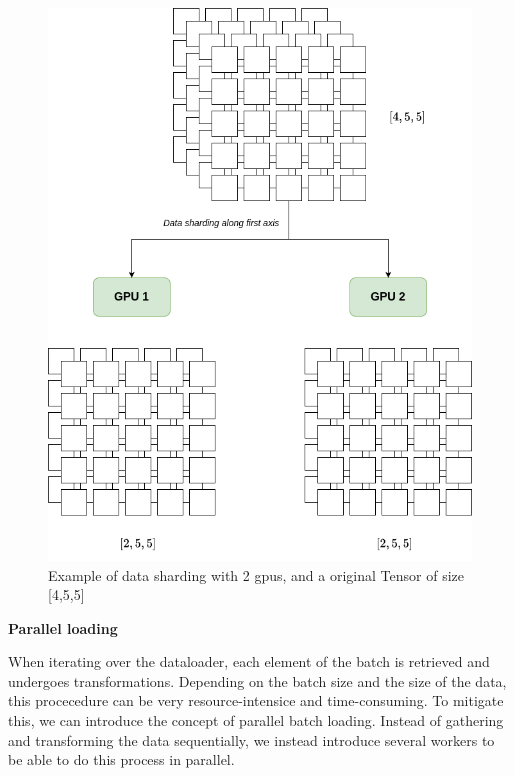 \begin{figure}[h]
    \centering
    \includegraphics[scale=0.2]{figures/sharding.png}
    \caption{Example of data sharding with 2 gpus, and a original Tensor of size [4,5,5]}
    \label{fig:sharding}
\end{figure}


\textbf{Parallel loading}

When iterating over the dataloader, each element of the batch is retrieved and undergoes transformations. Depending on the batch size and  the size of the data, this procecedure can be very resource-intensice and time-consuming. To mitigate this, we can introduce the concept of parallel batch loading. Instead of gathering and transforming the data sequentially, we instead introduce several workers to be able to do this process in parallel. 

\lstset{style=pstyle}
